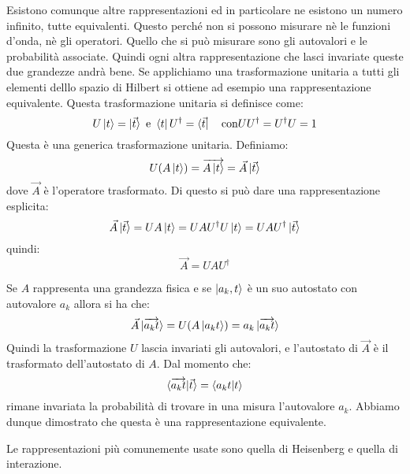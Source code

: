 Esistono comunque altre rappresentazioni ed in particolare ne esistono un numero
infinito, tutte equivalenti. Questo perché non si possono misurare nè le
funzioni d'onda, nè gli operatori. Quello che si può misurare sono gli
autovalori e le probabilità associate.
Quindi ogni altra rappresentazione che lasci invariate queste due grandezze
andrà bene.
Se applichiamo una trasformazione unitaria a tutti gli elementi delllo spazio di
Hilbert si ottiene ad esempio una rappresentazione equivalente.
Questa trasformazione unitaria si definisce come:
\begin{equation}
  U\ket{t}=\ket{\vec{t}}  \text{ e } \bra{t}U^{\dag}=\bra{\vec{t}} \quad 
\text{con} UU^{\dag}=U^{\dagger}U=1
\end{equation}
Questa è una generica trasformazione unitaria. Definiamo:
\begin{equation}
U(A\ket{t})=\overrightarrow{A\ket{t}}=\vec{A}\ket{\vec{t}}
\end{equation}
dove $\vec{A}$ è l'operatore trasformato. Di questo si può dare una
rappresentazione esplicita:
\begin{equation}
\vec{A}\ket{\vec{t}}=UA\ket{t}=UAU^{\dag}U\ket{t}=UAU^{\dag}\ket{\vec{t}}
\end{equation}
quindi:
\begin{equation}
\vec{A}=UAU^{\dag}
\end{equation}

Se $A$ rappresenta una grandezza fisica e se $\ket{a_{k},t}$ è un suo autostato
con autovalore $a_{k}$ allora si ha che:
\begin{equation}
  
\vec{A}\ket{\overrightarrow{a_{k}t}}=U(A\ket{a_{k}t})=a_{k}\ket{\overrightarrow{
a_{k}t}}
\end{equation}
Quindi la trasformazione $U$ lascia invariati gli autovalori, e l'autostato di
$\vec{A}$ è il trasformato dell'autostato di $A$. Dal momento che:
\begin{equation}
\braket{\overrightarrow{a_{k}t}|\vec{t}}=\braket{a_{k}t|t}
\end{equation}
rimane invariata la probabilità di trovare in una misura l'autovalore $a_{k}$.
Abbiamo dunque dimostrato che questa è una rappresentazione equivalente.

Le rappresentazioni più comunemente usate sono quella di Heisenberg e quella di
interazione.

